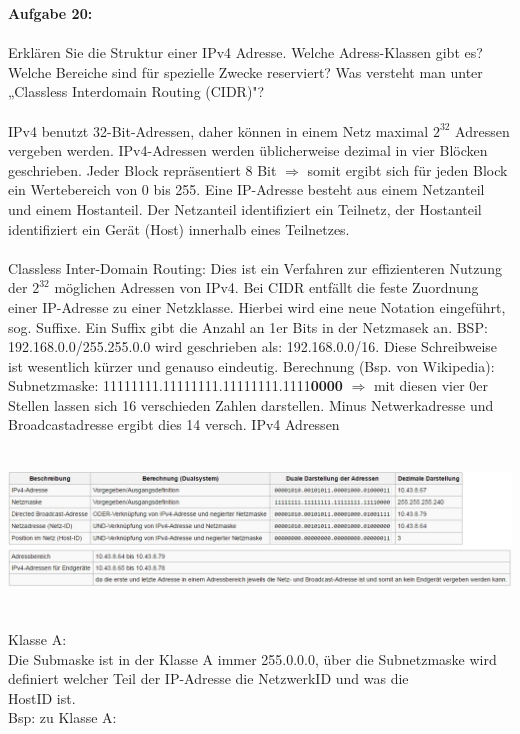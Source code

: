 \documentclass[12pt,a4paper]{report}
\begin{document}
\textbf{Aufgabe 20:}
\\
\\
Erklären Sie die Struktur einer IPv4 Adresse. Welche Adress-Klassen gibt es?
Welche Bereiche sind für spezielle Zwecke reserviert? Was versteht man unter
„Classless Interdomain Routing (CIDR)"?
\\
\\
IPv4 benutzt 32-Bit-Adressen, daher können in einem Netz maximal $2^{32}$ Adressen vergeben werden.
IPv4-Adressen werden üblicherweise dezimal in vier Blöcken geschrieben. Jeder Block repräsentiert 8 Bit $\Rightarrow$ somit ergibt sich für jeden Block ein Wertebereich von 0 bis 255. 
Eine IP-Adresse besteht aus einem Netzanteil und einem Hostanteil. Der Netzanteil identifiziert ein Teilnetz, der Hostanteil identifiziert ein Gerät (Host) innerhalb eines Teilnetzes.
\\
\\
Classless Inter-Domain Routing: Dies ist ein Verfahren zur effizienteren Nutzung der $2^{32}$ möglichen Adressen von IPv4. Bei CIDR entfällt die feste Zuordnung einer IP-Adresse zu einer Netzklasse. Hierbei wird eine neue Notation eingeführt, sog. Suffixe. Ein Suffix gibt die Anzahl an 1er Bits in der Netzmasek an. BSP: 192.168.0.0/255.255.0.0 wird geschrieben als: 192.168.0.0/16. Diese Schreibweise ist wesentlich kürzer und genauso eindeutig.
Berechnung (Bsp. von Wikipedia): 
Subnetzmaske: 11111111.11111111.11111111.1111\textbf{0000} $\Rightarrow$ mit diesen vier 0er Stellen lassen sich 16 verschieden Zahlen darstellen. Minus Netwerkadresse und Broadcastadresse ergibt dies 14 versch. IPv4 Adressen
\\
\\
\includegraphics[width = 17cm, height = 4cm]{bsp-cidr.jpg}
\ \\
Klasse A:\\
Die Submaske ist in der Klasse A immer 255.0.0.0, über die Subnetzmaske wird definiert welcher Teil der IP-Adresse die NetzwerkID und was die \\HostID ist.\\
Bsp: zu Klasse A:\\
\end{document}
